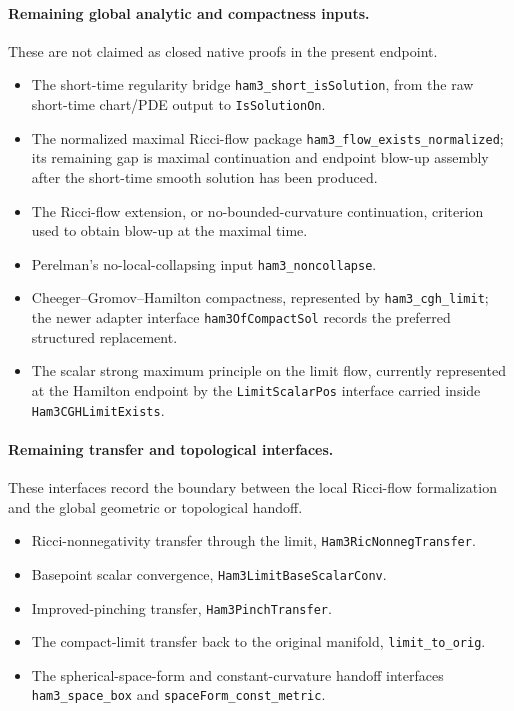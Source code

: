 \documentclass[11pt]{article}
\theoremstyle{plain}
\theoremstyle{definition}
\theoremstyle{remark}
\newcommand{\leanref}[1]{\nolinkurl{#1}}
\begin{document}
\paragraph{Remaining global analytic and compactness inputs.}
These are not claimed as closed native proofs in the present endpoint.
\begin{itemize}[leftmargin=2em]
  \item The short-time regularity bridge \leanref{ham3_short_isSolution}, from
  the raw short-time chart/PDE output to \leanref{IsSolutionOn}.
  \item The normalized maximal Ricci-flow package
  \leanref{ham3_flow_exists_normalized}; its remaining gap is maximal
  continuation and endpoint blow-up assembly after the short-time smooth
  solution has been produced.
  \item The Ricci-flow extension, or no-bounded-curvature continuation,
  criterion used to obtain blow-up at the maximal time.
  \item Perelman's no-local-collapsing input \leanref{ham3_noncollapse}.
  \item Cheeger--Gromov--Hamilton compactness, represented by
  \leanref{ham3_cgh_limit}; the newer adapter interface
  \leanref{ham3OfCompactSol} records the preferred structured replacement.
  \item The scalar strong maximum principle on the limit flow, currently
  represented at the Hamilton endpoint by the \leanref{LimitScalarPos}
  interface carried inside \leanref{Ham3CGHLimitExists}.
\end{itemize}

\paragraph{Remaining transfer and topological interfaces.}
These interfaces record the boundary between the local Ricci-flow formalization
and the global geometric or topological handoff.
\begin{itemize}[leftmargin=2em]
  \item Ricci-nonnegativity transfer through the limit,
  \leanref{Ham3RicNonnegTransfer}.
  \item Basepoint scalar convergence, \leanref{Ham3LimitBaseScalarConv}.
  \item Improved-pinching transfer, \leanref{Ham3PinchTransfer}.
  \item The compact-limit transfer back to the original manifold,
  \leanref{limit_to_orig}.
  \item The spherical-space-form and constant-curvature handoff interfaces
  \leanref{ham3_space_box} and \leanref{spaceForm_const_metric}.
\end{itemize}
\end{document}

